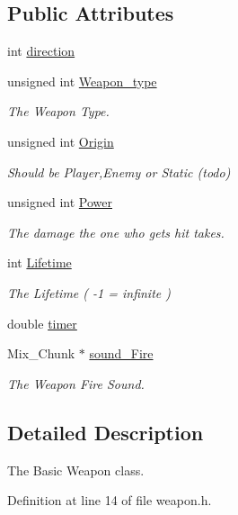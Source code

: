 \subsection*{Public Attributes}
\begin{DoxyCompactItemize}
\item 
int \hyperlink{classc_weapon_a58de53c03a5be3817f6d5a03dac4b9fa}{direction}
\item 
unsigned int \hyperlink{classc_weapon_a457996bcbe591da765dfb8b427a72f29}{Weapon\-\_\-type}
\begin{DoxyCompactList}\small\item\em The Weapon Type. \end{DoxyCompactList}\item 
unsigned int \hyperlink{classc_weapon_a2a521dd1a2aa10d5f6c0b45c09932519}{Origin}
\begin{DoxyCompactList}\small\item\em Should be Player,Enemy or Static (todo) \end{DoxyCompactList}\item 
unsigned int \hyperlink{classc_weapon_aa33960894f9ca703e3b3ad6a9f7f3f67}{Power}
\begin{DoxyCompactList}\small\item\em The damage the one who gets hit takes. \end{DoxyCompactList}\item 
int \hyperlink{classc_weapon_a7bc9a58e30a80556ba83e32067657b74}{Lifetime}
\begin{DoxyCompactList}\small\item\em The Lifetime ( -\/1 = infinite ) \end{DoxyCompactList}\item 
double \hyperlink{classc_weapon_ad8adebfcb59e5f2cd61951f87691da6a}{timer}
\item 
Mix\-\_\-\-Chunk $\ast$ \hyperlink{classc_weapon_a3502c93a2f35dbcc0f9e91598de8f864}{sound\-\_\-\-Fire}
\begin{DoxyCompactList}\small\item\em The Weapon Fire Sound. \end{DoxyCompactList}\end{DoxyCompactItemize}


\subsection{Detailed Description}
The Basic Weapon class. 

Definition at line 14 of file weapon.\-h.



